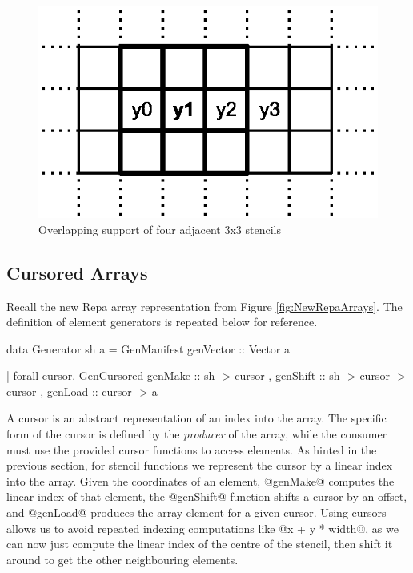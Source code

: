 \begin{figure}
\begin{center}
\includegraphics[scale=0.6]{figs/Stencil4.eps}
\end{center}
\caption{Overlapping support of four adjacent 3x3 stencils}
\label{fig:OverlappingSupport}
\end{figure}


\subsection{Cursored Arrays}
Recall the new Repa array representation from Figure \ref{fig:NewRepaArrays}. The definition of element generators is repeated below for reference. 

\begin{small}
\begin{code}
data Generator sh a
   = GenManifest { genVector :: Vector a }	
		
   | forall cursor. 
     GenCursored { genMake   :: sh -> cursor
                 , genShift  :: sh -> cursor -> cursor
                 , genLoad   :: cursor -> a }
\end{code}
\end{small}

A cursor is an abstract representation of an index into the array. The specific form of the cursor is defined by the \emph{producer} of the array, while the consumer must use the provided cursor functions to access elements. As hinted in the previous section, for stencil functions we represent the cursor by a linear index into the array. Given the coordinates of an element, @genMake@ computes the linear index of that element, the @genShift@ function shifts a cursor by an offset, and @genLoad@ produces the array element for a given cursor. Using cursors allows us to avoid repeated indexing computations like @x + y * width@, as we can now just compute the linear index of the centre of the stencil, then shift it around to get the other neighbouring elements.

